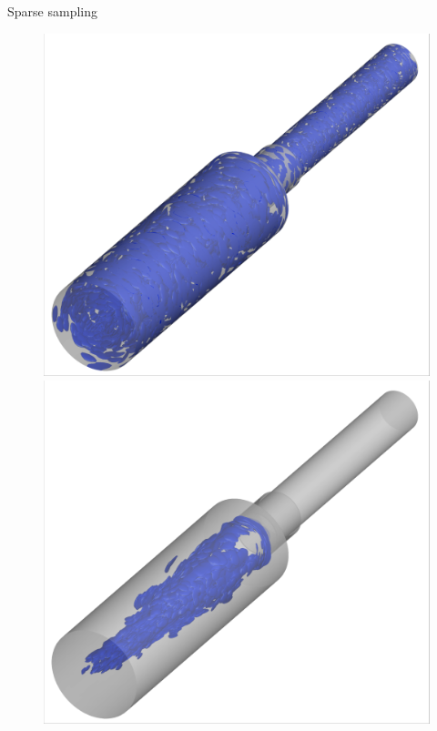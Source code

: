 \documentclass[]{beamer}
\begin{document}
\begin{frame}{Sparse sampling}
	\begin{figure}
		\centering
		\begin{minipage}{0.3\linewidth}
			\includegraphics[width=0.99\linewidth,trim={0.5em 0.5em 0.5em 0.5em},clip]{Images/experiments/cvrc/iblank/random_iblank_iso.png}
		\end{minipage}
		\begin{minipage}{0.3\linewidth}
			\includegraphics[width=0.99\linewidth,trim={0.5em 0.5em 0.5em 0.5em},clip]{Images/experiments/cvrc/iblank/eigenvec_iblank_iso.png}
		\end{minipage}
	

\end{figure}
\end{frame}
\end{document}
